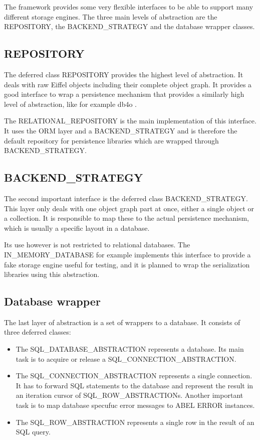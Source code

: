 The framework provides some very flexible interfaces to be able to support many different storage engines. 
The three main levels of abstraction are the REPOSITORY, the BACKEND\_STRATEGY and the database wrapper classes.

\subsection{REPOSITORY}

The deferred class REPOSITORY provides the highest level of abstraction.
It deals with raw Eiffel objects including their complete object graph.
It provides a good interface to wrap a persistence mechanism that provides a similarly high level of abstraction, like for example db4o \cite{db4o}.

The RELATIONAL\_REPOSITORY is the main implementation of this interface.
It uses the ORM layer and a BACKEND\_STRATEGY and is therefore the default repository for persistence libraries which are wrapped through BACKEND\_STRATEGY.

\subsection{BACKEND\_STRATEGY}

The second important interface is the deferred class BACKEND\_STRATEGY.
This layer only deals with one object graph part at once, either a single object or a collection.
It is responsible to map these to the actual persistence mechanism, which is usually a specific layout in a database.

Its use however is not restricted to relational databases.
The IN\_MEMORY\_DATABASE for example implements this interface to provide a fake storage engine useful for testing, and it is planned to wrap the serialization libraries using this abstraction.

\subsection{Database wrapper}


The last layer of abstraction is a set of wrappers to a database. 
It consists of three deferred classes: 
\begin{itemize}
 \item The SQL\_DATABASE\_ABSTRACTION represents a database. Its main task is to acquire or release a SQL\_CONNECTION\_ABSTRACTION.
 \item The SQL\_CONNECTION\_ABSTRACTION represents a single connection. 
It has to forward SQL statements to the database and represent the result in an iteration cursor of SQL\_ROW\_ABSTRACTIONs.
Another important task is to map database specufuc error messages to ABEL ERROR instances.
  \item The SQL\_ROW\_ABSTRACTION represents a single row in the result of an SQL query.
\end{itemize}

